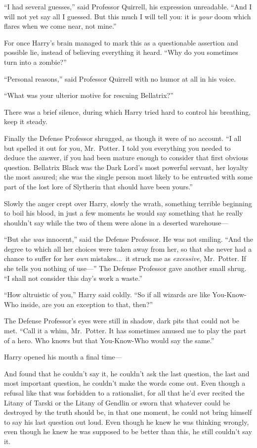 “I had several guesses,” said Professor Quirrell, his expression unreadable. “And I will not yet say all I guessed. But this much I will tell you: it is \emph{your} doom which flares when we come near, not mine.”

For once Harry’s brain managed to mark this as a questionable assertion and possible lie, instead of believing everything it heard. “Why do you sometimes turn into a zombie?”

“Personal reasons,” said Professor Quirrell with no humor at all in his voice.

“What was your ulterior motive for rescuing Bellatrix?”

There was a brief silence, during which Harry tried hard to control his breathing, keep it steady.

Finally the Defense Professor shrugged, as though it were of no account. “I all but spelled it out for you, Mr.~Potter. I told you everything you needed to deduce the answer, if you had been mature enough to consider that first obvious question. Bellatrix Black was the Dark Lord’s most powerful servant, her loyalty the most assured; she was the single person most likely to be entrusted with some part of the lost lore of Slytherin that should have been yours.”

Slowly the anger crept over Harry, slowly the wrath, something terrible beginning to boil his blood, in just a few moments he would say something that he really shouldn’t say while the two of them were alone in a deserted warehouse—

“But she \emph{was} innocent,” said the Defense Professor. He was not smiling. “And the degree to which all her choices were taken away from her, so that she never had a chance to suffer for her \emph{own} mistakes...\ it struck me as \emph{excessive}, Mr.~Potter. If she tells you nothing of use—” The Defense Professor gave another small shrug. “I shall not consider this day’s work a waste.”

“How altruistic of you,” Harry said coldly. “So if all wizards are like You-Know-Who inside, are you an exception to that, then?”

The Defense Professor’s eyes were still in shadow, dark pits that could not be met. “Call it a whim, Mr.~Potter. It has sometimes amused me to play the part of a hero. Who knows but that You-Know-Who would say the same.”

Harry opened his mouth a final time—

And found that he couldn’t say it, he couldn’t ask the last question, the last and most important question, he couldn’t make the words come out. Even though a refusal like that was forbidden to a rationalist, for all that he’d ever recited the Litany of Tarski or the Litany of Gendlin or sworn that whatever could be destroyed by the truth should be, in that one moment, he could not bring himself to say his last question out loud. Even though he knew he was thinking wrongly, even though he knew he was supposed to be better than this, he still couldn’t say it.

